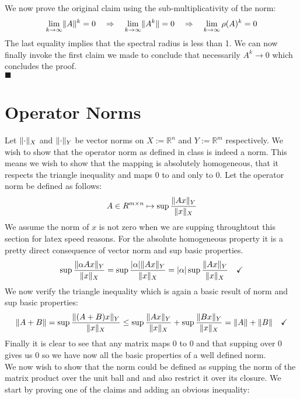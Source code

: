 \documentclass{article}
\DeclarePairedDelimiter{\abs}{\lvert}{\rvert}
\DeclarePairedDelimiter{\norm}{\lVert}{\rVert}
\begin{document}
	We now prove the original claim using the sub-multiplicativity of the norm: 
	\begin{equation}
		\lim\limits_{k\rightarrow \infty} \norm A ^k = 0 \quad \Rightarrow \quad  \lim\limits_{k\rightarrow \infty} \norm {A^k} = 0 \quad \Rightarrow \quad \lim\limits_{k\rightarrow \infty } \rho(A)^k = 0  
	\end{equation}
	The last equality implies that the spectral radius is less than 1. We can now finally invoke the first claim we made to conclude that necessarily $A^k \rightarrow 0$ which concludes the proof.\\
	$\blacksquare$
	\clearpage
	\section{Operator Norms}
	Let $\norm{\cdot}_X$ and $\norm{\cdot}_Y$ be vector norms on $X:= \mathbb R^n $ and $Y:= \mathbb R^m$ respectively. We wish to show  that the operator norm as defined in class is indeed a norm. This means we wish to show that the mapping is absolutely homogeneous, that it respects the triangle inequality and maps 0 to and only to 0. Let the operator norm be defined as follows:
	\begin{equation}
		A\in R^{m\times n} \mapsto \sup \frac{\norm{Ax}_Y}{\norm{x}_X}
	\end{equation}
	We assume the norm of $x$ is not zero when we are supping throughtout this section for latex speed reasons. For the absolute homogeneous property it is a pretty direct consequence of vector norm and sup basic properties.
	\begin{equation}
		\sup \frac{\norm{\alpha Ax}_Y}{\norm{x}_X} = \sup \frac{\abs \alpha \norm{ Ax}_Y}{\norm{x}_X} = \abs \alpha\sup \frac{\norm{ Ax}_Y}{\norm{x}_X} \quad \checkmark
	\end{equation}
	We now verify the triangle inequality which is again a basic result of norm and sup basic properties:
	\begin{equation}
		\norm{A+B} = \sup \frac{\norm{(A+B)x}_Y}{\norm{x}_X} \leq \sup  \frac{\norm{ Ax}_Y}{\norm{x}_X} + \sup \frac{\norm{Bx}_Y}{\norm{x}_X} = \norm A + \norm B \quad \checkmark
	\end{equation}
	 Finally it is clear to see that any matrix maps 0 to 0 and that supping over $0$ gives us $0$ so we have now all the basic properties of a well defined norm. \\
	 We now wish to show that the norm could be defined as supping the norm of the matrix product over the unit ball and and also restrict it over its closure. We start by proving one of the claims and adding an obvious inequality:
\end{document}
